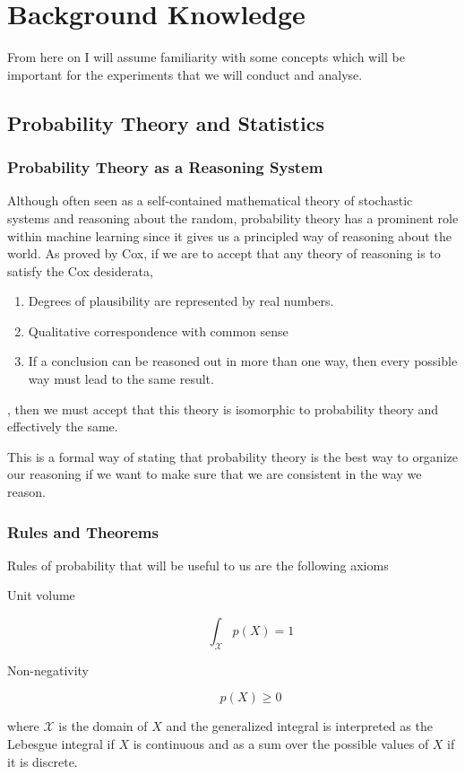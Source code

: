 \chapter{Background Knowledge}
\label{BackgroundKnowledgeCh}

From here on I will assume familiarity with some concepts which will be
important for the experiments that we will conduct and analyse.

\section{Probability Theory and Statistics}

\subsection{Probability Theory as a Reasoning System}
Although often seen as a self-contained mathematical theory of stochastic
systems and reasoning about the random, probability theory has a prominent role
within machine learning since it gives us a principled way of reasoning about
the world. As proved by Cox, if we are to accept that any theory of reasoning is
to satisfy the Cox desiderata,
\begin{enumerate}
\item Degrees of plausibility are represented by real numbers.
\item Qualitative correspondence with common sense
\item If a conclusion can be reasoned out in more than one way, then
  every possible way must lead to the same result.
\end{enumerate},
then we must accept that this theory is isomorphic to probability theory and
effectively the same.

This is a formal way of stating that probability theory is the best way to
organize our reasoning if we want to make sure that we are consistent in the way
we reason.\cite[p.~3-23]{jaynes2003probability}

\subsection{Rules and Theorems}
Rules of probability that will be useful to us are the following axioms
\begin{description}
\item[Unit volume]
  \begin{equation}
    \label{eq:unit_vol_prob_axiom}
    \int_{\mathcal{X}}p(X) = 1
  \end{equation}
\item[Non-negativity]
  \begin{equation}
    \label{eq:non_neg_of_prob}
    p(X) \geq 0
  \end{equation}
\end{description}
where $\mathcal{X}$ is the domain of $X$ and the generalized integral is interpreted as
the Lebesgue integral if $X$ is continuous and as a sum over the possible values
of $X$ if it is discrete.

